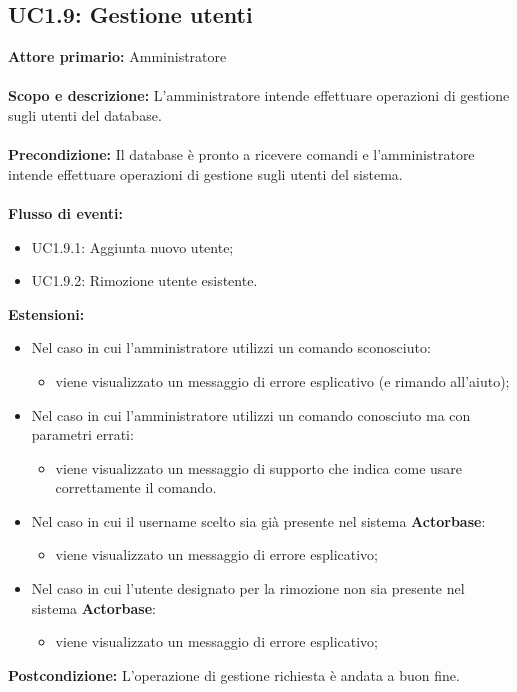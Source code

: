 \documentclass{scalatekids-article}
\begin{document}
\subsection{UC1.9: Gestione utenti}
\textbf{Attore primario:} Amministratore\\ \\
\textbf{Scopo e descrizione:} L'amministratore intende effettuare operazioni di gestione sugli utenti del database.\\ \\
\textbf{Precondizione:} Il database è pronto a ricevere comandi e l'amministratore intende effettuare operazioni di gestione sugli utenti del sistema.\\ \\
\textbf{Flusso di eventi:}
\begin{itemize}
\item UC1.9.1: Aggiunta nuovo utente;
\item UC1.9.2: Rimozione utente esistente.
\end{itemize}
\textbf{Estensioni:}
\begin{itemize}
\item Nel caso in cui l'amministratore utilizzi un comando sconosciuto:
  \begin{itemize}
  \item viene visualizzato un messaggio di errore esplicativo (e rimando all'aiuto);
  \end{itemize}
\item Nel caso in cui l'amministratore utilizzi un comando conosciuto ma con parametri errati:
  \begin{itemize}
  \item viene visualizzato un messaggio di supporto che indica come usare correttamente il comando.
  \end{itemize}
\item Nel caso in cui il username scelto sia già presente nel sistema \textbf{Actorbase}:
  \begin{itemize}
  \item viene visualizzato un messaggio di errore esplicativo;
  \end{itemize}
\item Nel caso in cui l'utente designato per la rimozione non sia presente nel sistema \textbf{Actorbase}:
  \begin{itemize}
  \item viene visualizzato un messaggio di errore esplicativo;
  \end{itemize}
\end{itemize}
\textbf{Postcondizione:} L'operazione di gestione richiesta è andata a buon fine.
\end{document}
